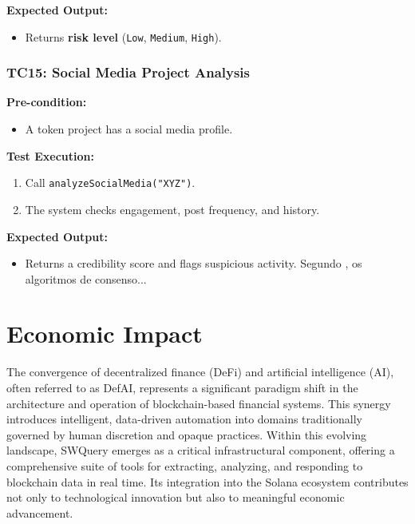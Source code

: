 \documentclass[
]{article}
\providecommand{\tightlist}{%
  \setlength{\itemsep}{0pt}\setlength{\parskip}{0pt}}
\begin{document}
\textbf{Expected Output:}

\begin{itemize}
\tightlist
\item
  Returns \textbf{risk level} (\texttt{Low}, \texttt{Medium},
  \texttt{High}).
\end{itemize}

\hypertarget{tc15-social-media-project-analysis}{%
\subsubsection{\texorpdfstring{\textbf{TC15: Social Media Project
Analysis}}{TC15: Social Media Project Analysis}}\label{tc15-social-media-project-analysis}}

\textbf{Pre-condition:}

\begin{itemize}
\tightlist
\item
  A token project has a social media profile.
\end{itemize}

\textbf{Test Execution:}

\begin{enumerate}
\def\labelenumi{\arabic{enumi}.}
\tightlist
\item
  Call \texttt{analyzeSocialMedia("XYZ")}.
\item
  The system checks engagement, post frequency, and history.
\end{enumerate}

\textbf{Expected Output:}

\begin{itemize}
\tightlist
\item
  Returns a credibility score and flags suspicious activity.
  Segundo \textcite{wang2022}, os algoritmos de consenso... \cite{griffain2025}
\end{itemize}

\section{Economic Impact}

The convergence of decentralized finance (DeFi) and artificial intelligence (AI), often referred to as DefAI, represents a significant paradigm shift in the architecture and operation of blockchain-based financial systems. This synergy introduces intelligent, data-driven automation into domains traditionally governed by human discretion and opaque practices. Within this evolving landscape, SWQuery emerges as a critical infrastructural component, offering a comprehensive suite of tools for extracting, analyzing, and responding to blockchain data in real time. Its integration into the Solana ecosystem contributes not only to technological innovation but also to meaningful economic advancement.
\end{document}
